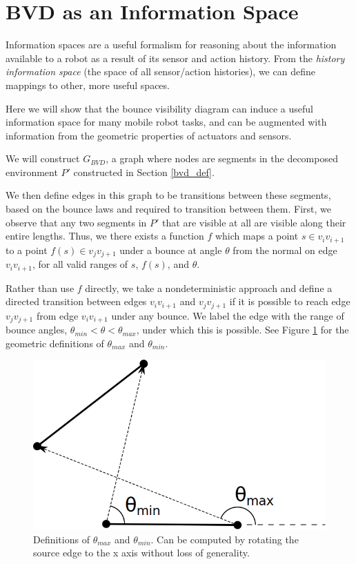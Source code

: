 \documentclass[]{styles/svproc}  %
\begin{document}
\section{BVD as an Information Space \label{bvd_info}}

Information spaces \cite{tovar2005information} are a useful formalism for
reasoning about the information available to a robot as a result of its sensor
and action history. From the \emph{history information space} (the space of all
sensor/action histories), we can define mappings to other, more useful spaces.

Here we will show that the bounce visibility diagram can induce a useful
information space for many mobile robot tasks, and can be augmented with
information from the geometric properties of actuators and sensors.

We will construct $G_{BVD}$, a graph where nodes are segments in the decomposed
environment $P'$ constructed in Section \ref{bvd_def}.

We then define edges in this graph to be transitions between these segments, based on the bounce laws and
required to transition between them. First, we observe that any two segments in
$P'$ that are visible at all are visible along their entire lengths. Thus, we
there exists a function $f$ which maps a point $s \in v_i
v_{i+1}$ to a point $f(s) \in v_j v_{j+1}$ under a bounce at angle $\theta$ from
the normal on edge $v_i v_{i+1}$, for all valid ranges of $s$, $f(s)$, and
$\theta$.

Rather than use $f$ directly, we take a nondeterministic approach and define a
directed transition between edges $v_i v_{i+1}$ and $v_j v_{j+1}$ if it is
possible to reach edge $v_j v_{j+1}$ from edge $v_i v_{i+1}$ under any bounce.
We label the edge with the range of bounce angles, $\theta_{min} < \theta <
\theta_{max}$, under which this is possible. See Figure \ref{fig:bounce_range} for
the geometric definitions of $\theta_{max}$ and $\theta_{min}$.

\begin{figure}
    \includegraphics[width=0.8\linewidth]{figures/bouncerange.png}
    \centering
    \caption{Definitions of $\theta_{max}$ and $\theta_{min}$. Can be computed
by rotating the source edge to the x axis without loss of generality.}\label{fig:bounce_range}
    \centering
\end{figure}
\end{document}

